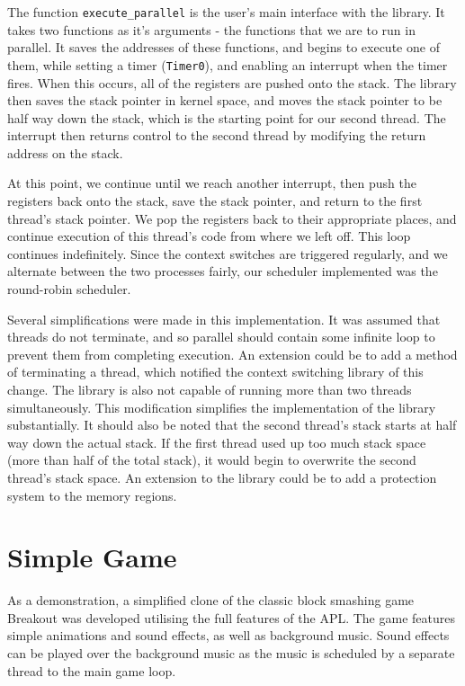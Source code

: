 \documentclass[a4paper,10pt]{article}
\begin{document}
The function \texttt{execute\_parallel} is the user's main interface with the
library. It takes two functions as it's arguments - the functions that we are
to run in parallel. It saves the addresses of these functions, and begins to
execute one of them, while setting a timer (\texttt{Timer0}), and enabling an
interrupt when the timer fires. When this occurs, all of the registers are
pushed onto the stack. The library then saves the stack pointer in kernel
space, and moves the stack pointer to be half way down the stack, which is the
starting point for our second thread.  The interrupt then returns control to
the second thread by modifying the return address on the stack.

At this point, we continue until we reach another interrupt, then push the
registers back onto the stack, save the stack pointer, and return to the first
thread's stack pointer. We pop the registers back to their appropriate places,
and continue execution of this thread's code from where we left off.  This
loop continues indefinitely. Since the context switches are triggered
regularly, and we alternate between the two processes fairly, our scheduler
implemented was the round-robin scheduler.

Several simplifications were made in this implementation. It was assumed that
threads do not terminate, and so parallel should contain some infinite loop to
prevent them from completing execution. An extension could be to add a method
of terminating a thread, which notified the context switching library of this
change.  The library is also not capable of running more than two threads
simultaneously. This modification simplifies the implementation of the library
substantially.
It should also be noted that the second thread's stack starts at half way down
the actual stack. If the first thread used up too much stack space (more than
half of the total stack), it would begin to overwrite the second thread's
stack space. An extension to the library could be to add a protection system
to the memory regions.

\section*{Simple Game}

As a demonstration, a simplified clone of the classic block smashing game
Breakout was developed utilising the full features of the APL. The game
features simple animations and sound effects, as well as background music.
Sound effects can be played over the background music as the music is
scheduled by a separate thread to the main game loop.
\end{document}
